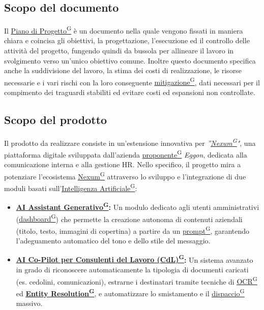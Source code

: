 \documentclass[a4paper,12pt]{article}
\providecommand{\glslink}[2]{\href{https://alittlebyte-19.github.io/Documentazione/glossario.html\#gls-#1}{\underline{#2}\textsuperscript{\scriptsize G}}}
\begin{document}
\subsection{Scopo del documento}
\label{sec:scopo_del_documento}
Il \glslink{piano-di-progetto}{Piano di Progetto} è un documento nella quale vengono fissati in maniera chiara e coincisa gli obiettivi, la progettazione, l'esecuzione ed il controllo delle attività del progetto, fungendo quindi da bussola per allineare il lavoro in svolgimento verso un'unico obiettivo comune.
Inoltre questo documento specifica anche la suddivisione del lavoro, la stima dei costi di realizzazione, le risorse necessarie e i vari rischi con la loro conseguente \glslink{mitigazione-dei-rischi}{mitigazione}, dati necessari per il compimento dei traguardi stabiliti ed evitare costi ed espansioni non controllate.


\subsection{Scopo del prodotto}
\label{sec:scopo_del_prodotto}
Il prodotto da realizzare consiste in un'estensione innovativa per \textit{''\glslink{nexum}{Nexum}"}, una piattaforma digitale sviluppata dall'azienda \glslink{committente-proponente}{proponente} \textit{Eggon}, dedicata alla comunicazione interna e alla gestione HR.
Nello specifico, il progetto mira a potenziare l'ecosistema \glslink{nexum}{Nexum} attraverso lo sviluppo e l'integrazione di due moduli basati sull'\glslink{intelligenza-artificiale-ai}{Intelligenza Artificiale}:
\begin{itemize}
    \item \textbf{\glslink{ai-assistant-generativo}{AI Assistant Generativo}:} Un modulo dedicato agli utenti amministrativi (\glslink{dashboard}{dashboard}) che permette la creazione autonoma di contenuti aziendali (titolo, testo, immagini di copertina) a partire da un \glslink{prompt}{prompt}, garantendo l'adeguamento automatico del tono e dello stile del messaggio.
    \item \textbf{\glslink{ai-co-pilot-per-consulenti-del-lavoro-cdl}{AI Co-Pilot per Consulenti del Lavoro (CdL)}:} Un sistema avanzato in grado di riconoscere automaticamente la tipologia di documenti caricati (es. cedolini, comunicazioni), estrarne i destinatari tramite tecniche di \glslink{ocr-riconoscimento-ottico-dei-caratteri}{OCR} ed \textbf{\glslink{entity-resolution}{Entity Resolution}}, e automatizzare lo smistamento e il \glslink{dispaccio}{dispaccio} massivo.
\end{itemize}
\end{document}
